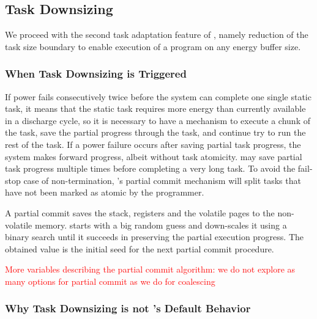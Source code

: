 \subsection{Task Downsizing}
\label{sec:task_downsizing}

We proceed with the second task adaptation feature of \sys, namely reduction of the task size boundary to enable execution of a program on any energy buffer size.

\begin{figure}
	\caption{}
\end{figure}

\subsubsection{When Task Downsizing is Triggered}

If power fails consecutively twice before the system can complete one single static task, it means that the static task requires more energy than currently available in a discharge cycle, so it is necessary to have a mechanism to execute a chunk of the task, save the partial progress through the task, and continue try to run the rest of the task. If a power failure occurs after saving partial task progress, the system makes forward progress, albeit without task atomicity. \sys may save partial task progress multiple times before completing a very long task. To avoid the fail-stop case of non-termination, \sys's partial commit mechanism will split tasks that have not been marked as atomic by the programmer.

A partial commit saves the stack, registers and the volatile pages to the non-volatile memory. \sys starts with a big random guess and down-scales it using a binary search until it succeeds in preserving the partial execution progress. The obtained value is the initial seed for the next partial commit procedure.

\textcolor{red}{More variables describing the partial commit algorithm: we do not explore as many options for partial commit as we do for coalescing}


\subsubsection{Why Task Downsizing is not \sys's Default Behavior}

